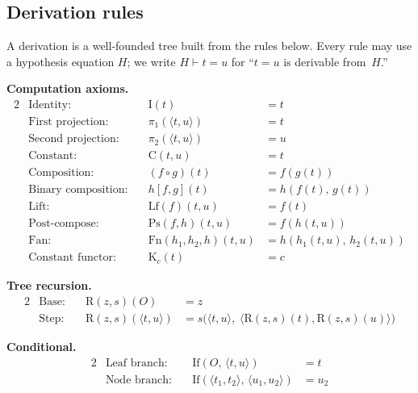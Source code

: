 \documentclass[11pt]{article}
\newcommand{\pair}[2]{\langle #1, #2 \rangle}
\begin{document}
\subsection*{Derivation rules}

A derivation is a well-founded tree built from the rules below.
Every rule may use a hypothesis equation $H$;
we write $H \vdash t = u$ for ``$t = u$ is derivable from~$H$.''

\medskip\noindent
\textbf{Computation axioms.}
\begin{alignat*}{2}
  &\text{Identity:}          &\quad \mathrm{I}(t) &= t \\
  &\text{First projection:}  &\quad \pi_1(\pair{t}{u}) &= t \\
  &\text{Second projection:} &\quad \pi_2(\pair{t}{u}) &= u \\
  &\text{Constant:}          &\quad \mathrm{C}(t, u) &= t \\
  &\text{Composition:}       &\quad (f \circ g)(t) &= f(g(t)) \\
  &\text{Binary composition:}&\quad h[f,g](t) &= h(f(t),\, g(t)) \\
  &\text{Lift:}              &\quad \mathrm{Lf}(f)(t, u) &= f(t) \\
  &\text{Post-compose:}      &\quad \mathrm{Ps}(f, h)(t, u) &= f(h(t,u)) \\
  &\text{Fan:}               &\quad \mathrm{Fn}(h_1,h_2,h)(t,u)
                                      &= h(h_1(t,u),\, h_2(t,u)) \\
  &\text{Constant functor:}  &\quad \mathrm{K}_c(t) &= c
\end{alignat*}

\noindent
\textbf{Tree recursion.}
\begin{alignat*}{2}
  &\text{Base:} &\quad \mathrm{R}(z, s)(O) &= z \\
  &\text{Step:} &\quad \mathrm{R}(z, s)(\pair{t}{u})
    &= s\bigl(\pair{t}{u},\;
         \pair{\mathrm{R}(z,s)(t)}{\mathrm{R}(z,s)(u)}\bigr)
\end{alignat*}

\noindent
\textbf{Conditional.}
\begin{alignat*}{2}
  &\text{Leaf branch:}     &\quad \mathrm{If}(O,\, \pair{t}{u}) &= t \\
  &\text{Node branch:}     &\quad \mathrm{If}(\pair{t_1}{t_2},\, \pair{u_1}{u_2}) &= u_2
\end{alignat*}
\end{document}
